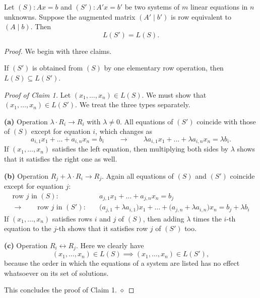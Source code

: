 \begin{theorem}
\label{thm:ero_preserve_solutions}
Let $(S): A x = b$ and $(S'): A' x = b'$ be two systems of $m$ linear equations in $n$ unknowns. Suppose the augmented matrix $(A' \mid b')$ is row equivalent to $(A \mid b)$. Then
\[
L(S') = L(S).
\]
\end{theorem}

\begin{proof}
We begin with three claims.

\begin{claim*}
\label{claim:ero_one_inclusion}
If $(S')$ is obtained from $(S)$ by one elementary row operation, then $L(S) \subseteq L(S')$.
\end{claim*}

\emph{Proof of Claim 1.} Let $(x_1, \dots, x_n) \in L(S)$. We must show that $(x_1, \dots, x_n) \in L(S')$. We treat the three types separately.

\textbf{(a)} Operation $\lambda \cdot R_i \to R_i$ with $\lambda \ne 0$. All equations of $(S')$ coincide with those of $(S)$ except for equation $i$, which changes as
\[
a_{i,1}x_1 + \dots + a_{i,n}x_n = b_i
\qquad \longrightarrow \qquad
\lambda a_{i,1}x_1 + \dots + \lambda a_{i,n}x_n = \lambda b_i.
\]
If $(x_1, \dots, x_n)$ satisfies the left equation, then multiplying both sides by $\lambda$ shows that it satisfies the right one as well.

\textbf{(b)} Operation $R_j + \lambda \cdot R_i \to R_j$. Again all equations of $(S)$ and $(S')$ coincide except for equation $j$:
\begin{align*}
\text{row } j \text{ in } (S): \quad & a_{j,1}x_1 + \dots + a_{j,n}x_n = b_j \\
\longrightarrow \qquad \text{row } j \text{ in } (S'): \quad & \bigl(a_{j,1} + \lambda a_{i,1}\bigr)x_1 + \dots + \bigl(a_{j,n} + \lambda a_{i,n}\bigr)x_n = b_j + \lambda b_i
\end{align*}
If $(x_1, \dots, x_n)$ satisfies rows $i$ and $j$ of $(S)$, then adding $\lambda$ times the $i$-th equation to the $j$-th shows that it satisfies row $j$ of $(S')$ too.

\textbf{(c)} Operation $R_i \leftrightarrow R_j$. Here we clearly have
\[
(x_1, \dots, x_n) \in L(S) \implies (x_1, \dots, x_n) \in L(S'),
\]
because the order in which the equations of a system are listed has no effect whatsoever on its set of solutions.

This concludes the proof of Claim 1. \hfill $\diamond$


\end{proof}

